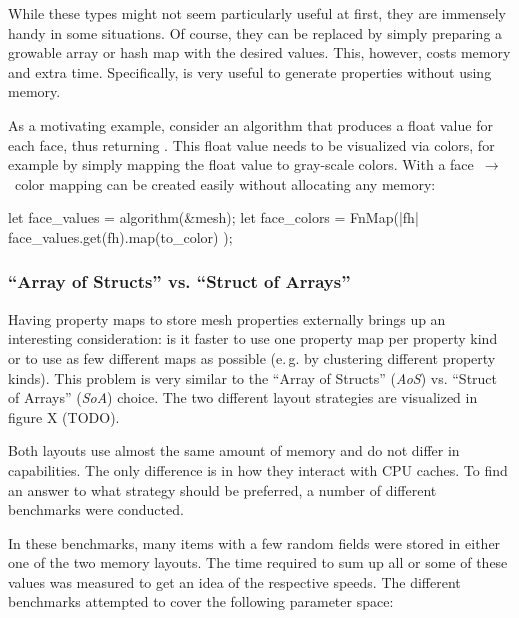 While these types might not seem particularly useful at first, they are immensely handy in some situations.
Of course, they can be replaced by simply preparing a growable array or hash map with the desired values.
This, however, costs memory and extra time.
Specifically,  is very useful to generate properties without using memory.

As a motivating example, consider an algorithm that produces a float value for each face, thus returning .
This float value needs to be visualized via colors, for example by simply mapping the float value to gray-scale colors.
With  a face~$\rightarrow$~color mapping can be created easily without allocating any memory:

\begin{center}
  \begin{minipage}{.59\textwidth}
    \begin{rustcode}
      let face_values = algorithm(&mesh);
      let face_colors = FnMap(|fh| {
          face_values.get(fh).map(to_color)
      });
    \end{rustcode}
  \end{minipage}
\end{center}


\subsubsection*{\enquote{Array of Structs} vs. \enquote{Struct of Arrays}}

Having property maps to store mesh properties externally brings up an interesting consideration: is it faster to use one property map per property kind or to use as few different maps as possible (e.\,g. by clustering different property kinds).
This problem is very similar to the \enquote{Array of Structs} (\emph{AoS}) vs. \enquote{Struct of Arrays} (\emph{SoA}) choice.
The two different layout strategies are visualized in figure X (TODO).

Both layouts use almost the same amount of memory and do not differ in capabilities.
The only difference is in how they interact with CPU caches.
To find an answer to what strategy should be preferred, a number of different benchmarks were conducted.


In these benchmarks, many items with a few random  fields were stored in either one of the two memory layouts.
The time required to sum up all or some of these values was measured to get an idea of the respective speeds.
The different benchmarks attempted to cover the following parameter space:

